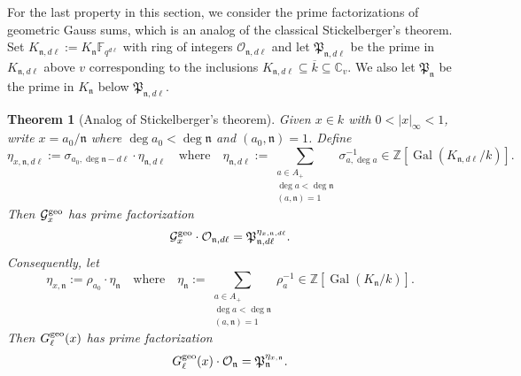 \documentclass[11pt]{amsart}
\theoremstyle{plain}
\newtheorem{thm}{Theorem}[subsection]
\theoremstyle{definition}
\theoremstyle{remark}
\numberwithin{equation}{section}
\newcommand{\ZZ}{\mathbb{Z}}
\newcommand{\CC}{\mathbb{C}}
\newcommand{\FF}{\mathbb{F}}
\newcommand{\nfk}{\mathfrak{n}}
\newcommand{\Pfk}{\mathfrak{P}}
\newcommand{\Gcal}{\mathcal{G}}
\newcommand{\Ocal}{\mathcal{O}}
\newcommand{\Gal}{\operatorname{Gal}}
\newcommand{\ovl}{\overline}
\newcommand{\sbe}{\subseteq}
\newcommand{\Fqdl}{\FF_{q^{d\l}}}
\newcommand{\bggs}{\Gcal^{\textnormal{geo}}}
\newcommand{\ggs}{G_\l^{\textnormal{geo}}}
\let\l\ell
\begin{document}
	For the last property in this section, we consider the prime factorizations of geometric Gauss sums, which is an analog of the classical Stickelberger's theorem.
	Set $K_{\nfk,d\l} := K_{\nfk}\Fqdl$ with ring of integers $\Ocal_{\nfk,d\l}$ and let $\Pfk_{\nfk,d\l}$ be the prime in $K_{\nfk,d\l}$ above $v$ corresponding to the inclusions $K_{\nfk,d\l} \sbe \ovl{k} \sbe \CC_v$.
	We also let $\Pfk_\nfk$ be the prime in $K_\nfk$ below $\Pfk_{\nfk,d\l}$.
	
	\begin{thm}[Analog of Stickelberger's theorem]     \label{analog-of-stickelbergers-theorem}
		Given $x \in k$ with $0 < |x|_\infty < 1$, write $x = a_0/\nfk$ where $\deg a_0 < \deg \nfk$ and $(a_0,\nfk)=1$.
		Define
		$$
		\eta_{x,\nfk,d\l} := \sigma_{a_0,\deg \nfk - d\l} \cdot \eta_{\nfk,d\l}
		\quad
		\text{where}
		\quad
		\eta_{\nfk,d\l} := \sum_{\substack{a\in A_+ \\ \deg a < \deg \nfk \\ (a,\nfk)=1}}  \sigma_{a,\deg a}^{-1} \in \ZZ[\Gal(K_{\nfk,d\l}/k)].
		$$
		Then $\bggs_x$ has prime factorization
		$$
		\bggs_x \cdot \Ocal_{\nfk,d\l}
		= \Pfk_{\nfk,d\l}^{\eta_{x,\nfk,d\l}}.
		$$
		Consequently, let
		$$
		\eta_{x,\nfk} := \rho_{a_0} \cdot \eta_{\nfk}
		\quad
		\text{where}
		\quad
		\eta_{\nfk} := \sum_{\substack{a\in A_+ \\ \deg a < \deg \nfk \\ (a,\nfk)=1}}  \rho_a^{-1} \in \ZZ[\Gal(K_{\nfk}/k)].
		$$
		Then $\ggs(x)$ has prime factorization
		$$
		\ggs(x) \cdot \Ocal_{\nfk}
		= \Pfk_{\nfk}^{\eta_{x,\nfk}}.
		$$
	\end{thm}
	
\end{document}

